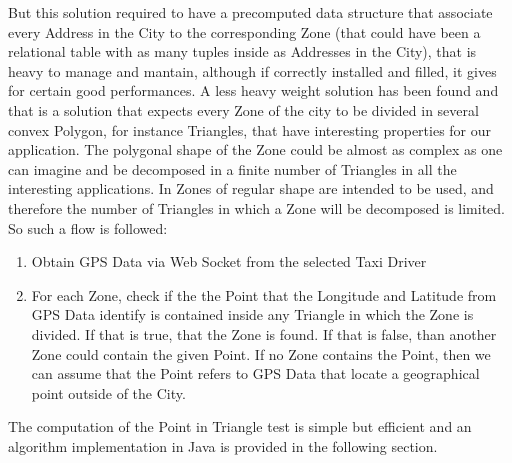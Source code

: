 But this solution required to have a precomputed data structure that associate every Address in the City to the corresponding Zone (that could have been a relational table with as many tuples inside as Addresses in the City), that is heavy to manage and mantain, although if correctly installed and filled, it gives for certain good performances.
A less heavy weight solution has been found and that is a solution that expects every Zone of the city to be divided in several convex Polygon, for instance Triangles, that have interesting properties for our application.
The polygonal shape of the Zone could be almost as complex as one can imagine and be decomposed in a finite number of Triangles in all the interesting applications.
In \myTaxiService{} Zones of regular shape are intended to be used, and therefore the number of Triangles in which a Zone will be decomposed is limited.
So such a flow is followed:
\begin{enumerate}
	\item Obtain GPS Data via Web Socket from the selected Taxi Driver
	\item For each Zone, check if the the Point that the Longitude and Latitude from GPS Data identify is contained inside any Triangle in which the Zone is divided. If that is true, that the Zone is found. If that is false, than another Zone could contain the given Point. If no Zone contains the Point, then we can assume that the Point refers to GPS Data that locate a geographical point outside of the City.
\end{enumerate}
The computation of the Point in Triangle test is simple but efficient and an algorithm implementation in Java is provided in the following section.